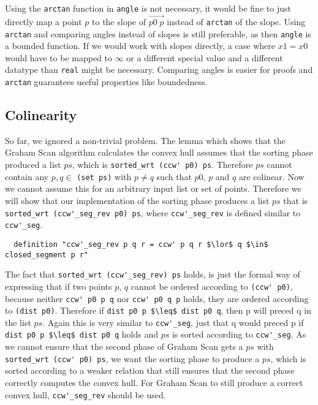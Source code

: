 Using the \lstinline|arctan| function in \lstinline|angle| is not necessary, it would be fine
to just directly map a point $p$ to the slope of $\overrightarrow{p0 \; p}$ instead of 
\lstinline|arctan| of the slope. Using \lstinline|arctan| and comparing angles
instead of slopes is still preferable, as then \lstinline|angle| is a bounded function. If we would work 
with slopes directly, a case where $x1 = x0$ would have to be mapped to $\infty$ or a 
different special value and a different datatype than \lstinline|real| might be necessary. Comparing
angles is easier for proofs and \lstinline|arctan| guarantees useful properties like boundedness.

\subsection{Colinearity}
\label{graham:colinear}
So far, we ignored a non-trivial problem. The lemma which shows that the Graham Scan 
algorithm calculates the convex hull assumes that the sorting phase produced a list 
$ps$, which is \lstinline|sorted_wrt (ccw' p0) ps|. Therefore $ps$ cannot contain any
$p,q \in$ \lstinline|(set ps)| with $p \neq q$ such that $p0$, $p$ and $q$ are colinear.
Now we cannot assume this for an arbitrary input list or set of points. Therefore we will
show that our implementation of the sorting phase produces a list $ps$ that is 
\lstinline|sorted_wrt (ccw'_seg_rev p0) ps|, where \lstinline|ccw'_seg_rev| is 
defined similar to \lstinline|ccw'_seg|.
\begin{lstlisting}
  definition "ccw'_seg_rev p q r = ccw' p q r $\lor$ q $\in$ closed_segment p r"
\end{lstlisting}
The fact that \lstinline|sorted_wrt (ccw'_seg_rev) ps| holds, is just the formal way 
of expressing that if two points $p$, $q$ cannot be ordered according to \lstinline|(ccw' p0)|, because
neither \lstinline|ccw' p0 p q| nor \lstinline|ccw' p0 q p| holds, they are ordered according to 
\lstinline|(dist p0)|. Therefore if \lstinline|dist p0 p $\leq$ dist p0 q|, then p will preced q in the 
list $ps$. Again this is very similar to \lstinline|ccw'_seg|, just that q would preced p if 
\lstinline|dist p0 p $\leq$ dist p0 q| holds and $ps$ is sorted according to \lstinline|ccw'_seg|.
As we cannot ensure that the second phase of Graham Scan gets a $ps$ with 
\lstinline|sorted_wrt (ccw' p0) ps|, we want the sorting phase to produce a $ps$, which 
is sorted according to a weaker relation that still ensures that the second phase correctly
computes the convex hull. For Graham Scan to still produce a 
correct convex hull, \lstinline|ccw'_seg_rev| should be used. 

